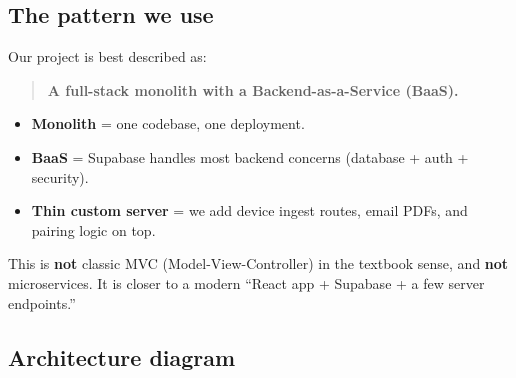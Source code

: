 \documentclass[11pt,a4paper]{article}
\begin{document}
\subsection{The pattern we use}

Our project is best described as:

\begin{quote}
\textbf{A full-stack monolith with a Backend-as-a-Service (BaaS).}
\end{quote}

\begin{itemize}[leftmargin=*]
  \item \textbf{Monolith} = one codebase, one deployment.
  \item \textbf{BaaS} = Supabase handles most backend concerns (database + auth + security).
  \item \textbf{Thin custom server} = we add device ingest routes, email PDFs, and pairing logic on top.
\end{itemize}

This is \textbf{not} classic MVC (Model-View-Controller) in the textbook sense, and \textbf{not} microservices. It is closer to a modern ``React app + Supabase + a few server endpoints.''

\subsection{Architecture diagram}
\end{document}
